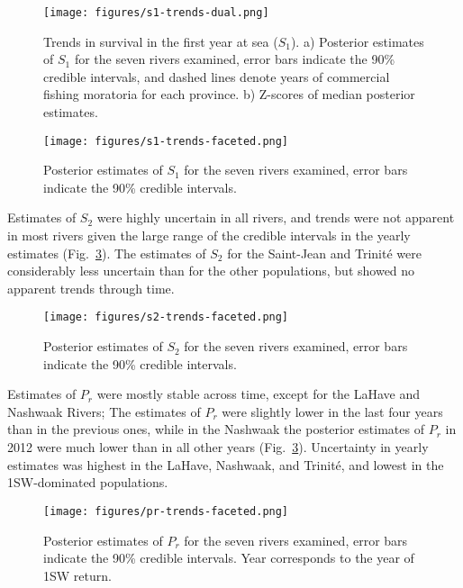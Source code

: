\documentclass[12pt]{article}
\newcommand{\So}{$S_{1}$\xspace}
\newcommand{\St}{$S_{2}$\xspace}
\newcommand{\Pg}{$P_r$\xspace}
\begin{document}
\begin{figure}[htbp] \centering
    \texttt{[image: figures/s1-trends-dual.png]}
    \caption{Trends in survival in the first year at sea (\So). a) Posterior
        estimates of \So for the seven rivers examined, error bars indicate
        the 90\% credible intervals, and dashed lines denote years of commercial
        fishing moratoria for each province. b) Z-scores of median posterior
        estimates.} \label{fig:s1-dual} \end{figure}

\begin{figure}[htbp] \centering
    \texttt{[image: figures/s1-trends-faceted.png]}
    \caption{Posterior estimates of \So for the seven rivers examined, error
        bars indicate the 90\% credible intervals.} \label{fig:s1-faceted}
\end{figure}

Estimates of \St were highly uncertain in all rivers, and trends 
were not apparent in most rivers given the large range of the credible
intervals in the yearly estimates (Fig.~\ref{fig:s2-faceted}). The estimates
of \St for the Saint-Jean and Trinit\'{e} were considerably less uncertain
than for the other populations, but showed no apparent trends through time.

\begin{figure}[htbp] \centering
    \texttt{[image: figures/s2-trends-faceted.png]}
    \caption{Posterior estimates of \St for the seven rivers examined, error
        bars indicate the 90\% credible intervals.} \label{fig:s2-faceted}
\end{figure}

Estimates of \Pg were mostly stable across time, except for the LaHave and
Nashwaak Rivers; The estimates of \Pg were slightly lower in the last four
years than in the previous ones, while in the Nashwaak the posterior estimates
of \Pg in 2012 were much lower than in all other years
(Fig.~\ref{fig:s2-faceted}). Uncertainty in yearly estimates was highest in
the LaHave, Nashwaak, and Trinit\'{e}, and lowest in the 1SW-dominated
populations.

\begin{figure}[htbp] \centering
    \texttt{[image: figures/pr-trends-faceted.png]}
    \caption{Posterior estimates of \Pg for the seven rivers examined, error
        bars indicate the 90\% credible intervals. Year corresponds to the
        year of 1SW return.} \label{fig:pr-faceted} 
\end{figure}
\end{document}
